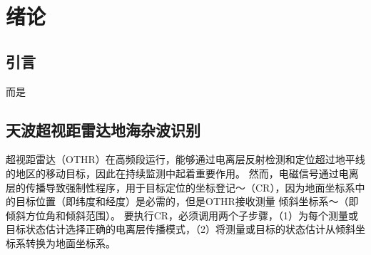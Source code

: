 \chapter{绪论}
\section{引言}
而是
\section{天波超视距雷达地海杂波识别}

超视距雷达（OTHR）在高频段运行，能够通过电离层反射检测和定位超过地平线的地区的移动目标，因此在持续监测中起着重要作用\cite{headrick1974over, fabrizio2013high}。 然而，电磁信号通过电离层的传播导致强制性程序，用于目标定位的坐标登记〜（CR），因为地面坐标系中的目标位置（即纬度和经度）是必需的，但是OTHR接收测量 倾斜坐标系〜（即倾斜方位角和倾斜范围）\cite{krolik1997maximum}。 要执行CR，必须调用两个子步骤，（1）为每个测量或目标状态估计选择正确的电离层传播模式，（2）将测量或目标的状态估计从倾斜坐标系转换为地面坐标系。

